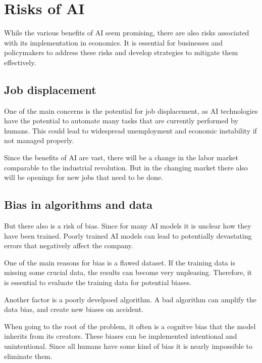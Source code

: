 \section{Risks of AI}
\label{sec:risks-of-ai}

While the various benefits of AI seem promising, there are also risks associated with its implementation in economics.
It is essential for businesses and policymakers to address these risks and develop strategies to mitigate them effectively.

\cite{AiEconomics}

\subsection{Job displacement}
\label{subsec:job-displacement}

One of the main concerns is the potential for job displacement, as AI technologies have the potential to automate many tasks that are currently performed by humans. This could lead to widespread unemployment and economic instability if not managed properly. 

Since the benefits of AI are vast, there will be a change in the labor market comparable to the industrial revolution.  
But in the changing market there also will be openings for new jobs that need to be done. 

\cite{AiAndJobs} 

\subsection{Bias in algorithms and data}
\label{subsec:bias-in-algorithms-and-data}

But there also is a risk of bias. Since for many AI models it is unclear how they have been trained. 
Poorly trained AI models can lead to potentially devastating errors that negatively affect the company.

One of the main reasons for bias is a flawed dataset. If the training data is missing some crucial data, the results can become very unpleasing. 
Therefore, it is essential to evaluate the training data for potential biases.

Another factor is a poorly develpoed algorithm. A bad algorithm can amplify the data bias, and create new biases on accident. 

When going to the root of the problem, it often is a cognitve bias that the model inherits from its creators. 
These biases can be implemented intentional and unintentional. Since all humans have some kind of bias it is nearly impossible to eliminate them. 

